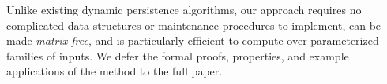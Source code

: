 \documentclass[10pt twocolumn]{article}
\numberwithin{equation}{section}
\newcommand{\+}{%
	\raisebox{0.18ex}{\scaleobj{0.55}{+}}
}
\theoremstyle{definition}
\theoremstyle{definition}
\begin{document}
\begin{multicols}{2}
Unlike existing dynamic persistence algorithms, our approach requires no complicated data structures or maintenance procedures to implement, can be made \emph{matrix-free}, and is particularly efficient to compute over parameterized families of inputs.
We defer the formal proofs, properties, and example applications of the method to the full paper. 



 
\end{multicols}
\end{document}
